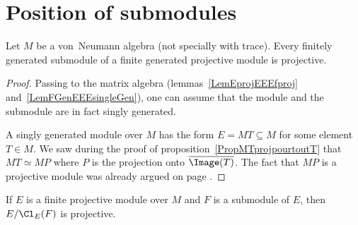 
					\section{Position of submodules}

\begin{proposition}
Let $M$ be a von~Neumann algebra (not specially with trace). Every finitely generated submodule of a finite generated projective module is projective.
\end{proposition}

\begin{proof}
Passing to the matrix algebra (lemmas~\ref{LemEprojEEEfproj} and~\ref{LemFGenEEEsingleGen}), one can assume that the module and the submodule are in fact singly generated.

A singly generated module over $ M$ has the form $E=MT\subseteq M$ for some element $T\in M$. We saw during the proof of proposition~\ref{PropMTprojpourtoutT} that $MT\simeq MP$ where $P$ is the projection onto $\overline{ \Image(T) }$. The fact that $MP$ is a projective module was already argued on page \pageref{PgMPprojModule}.
\end{proof}

\begin{proposition}			\label{PropEfgpFssmodQuotProj}
If $E$ is a finite projective module over $M$ and $F$ is a submodule of $E$, then $E/\Cl_E(F)$ is projective.
\end{proposition}

